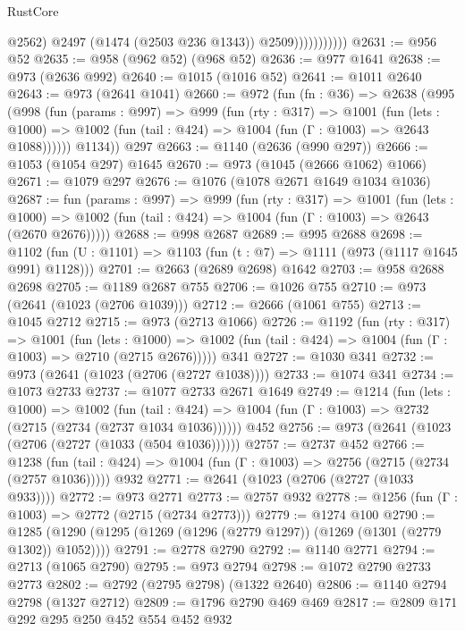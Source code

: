 \begin{lexlean}{RustCore}
\begin{coremodule}
                            @2562)
                          @2497
                          (@1474 (@2503 @236 @1343))
                          @2509)))))))))))
@2631 := @956 @52
@2635 := @958 (@962 @52) (@968 @52)
@2636 := @977 @1641
@2638 := @973 (@2636 @992)
@2640 := @1015 (@1016 @52)
@2641 := @1011 @2640
@2643 := @973 (@2641 @1041)
@2660 := @972
    (fun (fn : @36) =>
    @2638
      (@995
        (@998
          (fun (params : @997) =>
          @999
            (fun (rty : @317) =>
            @1001
              (fun (lets : @1000) =>
              @1002 (fun (tail : @424) => @1004 (fun (Γ : @1003) => @2643 @1088))))))
        @1134))
    @297
@2663 := @1140 (@2636 (@990 @297))
@2666 := @1053 (@1054 @297) @1645
@2670 := @973 (@1045 (@2666 @1062) @1066)
@2671 := @1079 @297
@2676 := @1076 (@1078 @2671 @1649 @1034 @1036)
@2687 := fun (params : @997) =>
  @999
    (fun (rty : @317) =>
    @1001
      (fun (lets : @1000) =>
      @1002 (fun (tail : @424) => @1004 (fun (Γ : @1003) => @2643 (@2670 @2676)))))
@2688 := @998 @2687
@2689 := @995 @2688
@2698 := @1102 (fun (U : @1101) => @1103 (fun (t : @7) => @1111 (@973 (@1117 @1645 @991) @1128)))
@2701 := @2663 (@2689 @2698) @1642
@2703 := @958 @2688 @2698
@2705 := @1189 @2687 @755
@2706 := @1026 @755
@2710 := @973 (@2641 (@1023 (@2706 @1039)))
@2712 := @2666 (@1061 @755)
@2713 := @1045 @2712
@2715 := @973 (@2713 @1066)
@2726 := @1192
    (fun (rty : @317) =>
    @1001
      (fun (lets : @1000) =>
      @1002 (fun (tail : @424) => @1004 (fun (Γ : @1003) => @2710 (@2715 @2676)))))
    @341
@2727 := @1030 @341
@2732 := @973 (@2641 (@1023 (@2706 (@2727 @1038))))
@2733 := @1074 @341
@2734 := @1073 @2733
@2737 := @1077 @2733 @2671 @1649
@2749 := @1214
    (fun (lets : @1000) =>
    @1002
      (fun (tail : @424) => @1004 (fun (Γ : @1003) => @2732 (@2715 (@2734 (@2737 @1034 @1036))))))
    @452
@2756 := @973 (@2641 (@1023 (@2706 (@2727 (@1033 (@504 @1036))))))
@2757 := @2737 @452
@2766 := @1238
    (fun (tail : @424) => @1004 (fun (Γ : @1003) => @2756 (@2715 (@2734 (@2757 @1036)))))
    @932
@2771 := @2641 (@1023 (@2706 (@2727 (@1033 @933))))
@2772 := @973 @2771
@2773 := @2757 @932
@2778 := @1256 (fun (Γ : @1003) => @2772 (@2715 (@2734 @2773)))
@2779 := @1274 @100
@2790 := @1285 (@1290 (@1295 (@1269 (@1296 (@2779 @1297)) (@1269 (@1301 (@2779 @1302)) @1052))))
@2791 := @2778 @2790
@2792 := @1140 @2771
@2794 := @2713 (@1065 @2790)
@2795 := @973 @2794
@2798 := @1072 @2790 @2733 @2773
@2802 := @2792 (@2795 @2798) (@1322 @2640)
@2806 := @1140 @2794 @2798 (@1327 @2712)
@2809 := @1796 @2790 @469 @469
@2817 := @2809 @171 @292 @295 @250 @452 @554 @452 @932

\end{coremodule}
\end{lexlean}
